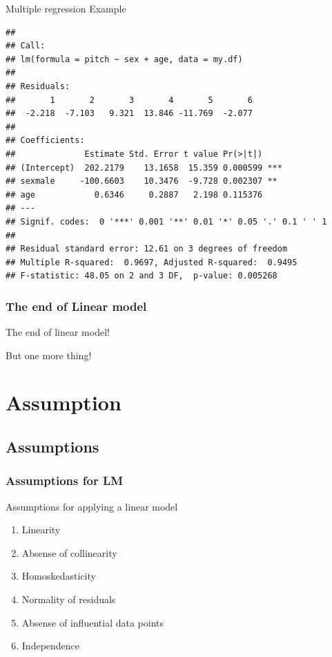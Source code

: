 \documentclass[10p]{beamer}\usepackage[]{graphicx}\usepackage[]{color}
\makeatletter
\newenvironment{kframe}{%
 \def\at@end@of@kframe{}%
 \ifinner\ifhmode%
  \def\at@end@of@kframe{\end{minipage}}%
  \begin{minipage}{\columnwidth}%
 \fi\fi%
 \def\FrameCommand##1{\hskip\@totalleftmargin \hskip-\fboxsep
 \colorbox{shadecolor}{##1}\hskip-\fboxsep
     \hskip-\linewidth \hskip-\@totalleftmargin \hskip\columnwidth}%
 \MakeFramed {\advance\hsize-\width
   \@totalleftmargin\z@ \linewidth\hsize
   \@setminipage}}%
 {\par\unskip\endMakeFramed%
 \at@end@of@kframe}
\newenvironment{knitrout}{}{} %
\makeatother
\begin{document}
\begin{frame}[fragile]{Multiple regression}
Example

\begin{knitrout}\scriptsize
{}\color{fgcolor}\begin{kframe}
\begin{verbatim}
## 
## Call:
## lm(formula = pitch ~ sex + age, data = my.df)
## 
## Residuals:
##       1       2       3       4       5       6 
##  -2.218  -7.103   9.321  13.846 -11.769  -2.077 
## 
## Coefficients:
##              Estimate Std. Error t value Pr(>|t|)    
## (Intercept)  202.2179    13.1658  15.359 0.000599 ***
## sexmale     -100.6603    10.3476  -9.728 0.002307 ** 
## age            0.6346     0.2887   2.198 0.115376    
## ---
## Signif. codes:  0 '***' 0.001 '**' 0.01 '*' 0.05 '.' 0.1 ' ' 1
## 
## Residual standard error: 12.61 on 3 degrees of freedom
## Multiple R-squared:  0.9697,	Adjusted R-squared:  0.9495 
## F-statistic: 48.05 on 2 and 3 DF,  p-value: 0.005268
\end{verbatim}
\end{kframe}
\end{knitrout}

\end{frame}

\begin{frame}
\frametitle{The end of Linear model}
\centering
\Huge
The end of linear model!

But one more thing!
\end{frame}

\section{Assumption}
\subsection{Assumptions}
\begin{frame}
\frametitle{Assumptions for LM}
Assumptions for applying a linear model
\begin{enumerate}
\item Linearity
\item Absense of collinearity
\item Homoskedasticity
\item Normality of residuals
\item Absense of influential data points
\item Independence
\end{enumerate}
\end{frame}
\end{document}
